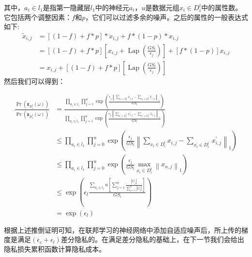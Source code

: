 其中，$a_{i} \in l_{1}$是指第一隐藏层$l_{1}$中的神经元$a_{i}$，$u$是数据元组$x_{i} \in D_{i}^{t}$中的属性数。它包括两个调整因素：$f$和$p$，它们可以过滤多余的噪声。之后的属性的一般表达式如下:
\begin{equation}
\begin{aligned}
\tilde{x}_{i, j} &=[(1-f)+f * p] * \ddot{x}_{i, j}+f *(1-p) * x_{i, j} \\
&=[(1-f)+f * p]\left[x_{i, j}+\operatorname{Lap}\left(\frac{G S_{l}}{\epsilon_{j}}\right)\right]+[f *(1-p)] x_{i, j} \\
&=x_{i, j}+[(1-f)+f * p]\left[\operatorname{Lap}\left(\frac{G S_{l}}{\epsilon_{j}}\right)\right]
\end{aligned}
\end{equation}
然后我们可以得到：

\begin{equation}
\begin{aligned}
\frac{\operatorname{Pr}\left(\ddot{\mathbf{z}}_{D_{i}^{t}}(\omega)\right)}{\operatorname{Pr}\left(\ddot{\mathbf{z}}_{D_{i}^{t}}(\omega)\right)} &=\frac{\prod_{a_{i} \in l_{1}} \prod_{j=1}^{u} \exp \left(\frac{\epsilon_{j}\left\|\sum_{x_{i} \in D_{i}^{t}} x_{i, j}-\sum_{x_{i} \in D_{i}^{t}} \tilde{x}_{i, j}\right\|_{1}}{G S_{l}}\right)}{\prod_{a_{i} \in l_{1}} \prod_{j=1}^{u} \exp \left(\frac{\epsilon_{j}\left\|\sum_{x_{i}^{\prime} \in D_{i}^{t^{\prime}}} x_{i, j}^{\prime}-\sum_{x_{i}^{\prime} \in D_{i}^{t^{\prime}}} \tilde{x}_{i, j}^{\prime}\right\|_{1}}{G S_{l}}\right)} \\
& \leq \prod_{a_{i} \in l_{1}} \prod_{j=0}^{u} \exp \left(\frac{\epsilon_{j}}{G S_{l}}\left\|\sum_{x_{i} \in D_{i}^{t}} x_{i, j}-\sum_{x_{i}^{\prime} \in D_{i}^{t^{\prime}}} x_{i, j}^{\prime}\right\|_{1}\right) \\
& \leq \prod_{a_{i} \in l_{1}} \prod_{j=0}^{u} \exp \left(\frac{\epsilon_{j}}{G S_{l}} \max _{x_{i} \in D_{i}^{t}}\left\|x_{n, j}\right\|_{1}\right) \\
& \leq \exp \left(\epsilon_{l} \frac{\sum_{a_{i} \in l_{1}} u\left[\sum_{j=1}^{u} \frac{\left|\ddot{C}_{j}\right|}{\sum_{j=1}^{u}\left|\ddot{C}_{j}\right|}\right]}{G S_{l}}\right) \\
&=\exp \left(\epsilon_{l}\right)
\end{aligned}
\end{equation}

根据上述推倒证明可知，在联邦学习的神经网络中添加自适应噪声后，所上传的梯度是满足$\left(\epsilon_{c}+\epsilon_{l}\right)$差分隐私的。在满足差分隐私的基础上，在下一节我们会给出隐私损失累积函数计算隐私成本。

